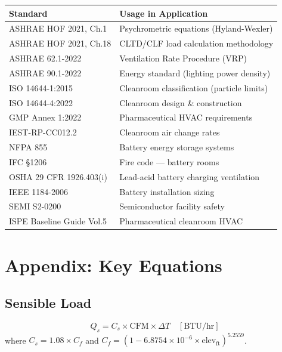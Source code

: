 \documentclass[12pt, a4paper, oneside]{report}
\begin{document}
\begin{longtable}{p{5cm}p{9cm}}
\toprule
\textbf{Standard} & \textbf{Usage in Application} \\
\midrule
\endhead
ASHRAE HOF 2021, Ch.1     & Psychrometric equations (Hyland-Wexler) \\
ASHRAE HOF 2021, Ch.18    & CLTD/CLF load calculation methodology \\
ASHRAE 62.1-2022          & Ventilation Rate Procedure (VRP) \\
ASHRAE 90.1-2022          & Energy standard (lighting power density) \\
ISO 14644-1:2015          & Cleanroom classification (particle limits) \\
ISO 14644-4:2022          & Cleanroom design \& construction \\
GMP Annex 1:2022          & Pharmaceutical HVAC requirements \\
IEST-RP-CC012.2           & Cleanroom air change rates \\
NFPA 855                  & Battery energy storage systems \\
IFC \S1206                & Fire code --- battery rooms \\
OSHA 29 CFR 1926.403(i)   & Lead-acid battery charging ventilation \\
IEEE 1184-2006            & Battery installation sizing \\
SEMI S2-0200              & Semiconductor facility safety \\
ISPE Baseline Guide Vol.5 & Pharmaceutical cleanroom HVAC \\
\bottomrule
\end{longtable}


\chapter{Appendix: Key Equations}

\section{Sensible Load}
\begin{equation}
  Q_s = C_s \times \text{CFM} \times \Delta T \quad [\text{BTU/hr}]
\end{equation}
where $C_s = 1.08 \times C_f$ and $C_f = (1 - 6.8754 \times 10^{-6} \times \text{elev}_{\text{ft}})^{5.2559}$.
\end{document}
